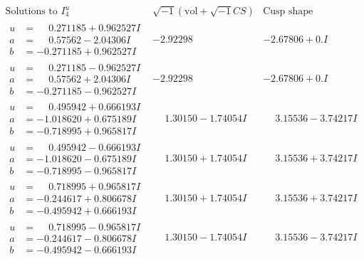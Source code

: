 \documentclass[1p]{elsarticle_modified}
\theoremstyle{definition}
\newcommand{\I}{\sqrt{-1}}
\begin{document}
$$\begin{array}{c|c|c}  
\text{Solutions to }I^u_{4}& \I (\text{vol} + \sqrt{-1}CS) & \text{Cusp shape}\\
 \hline 
\begin{aligned}
u &= \phantom{-}0.271185 + 0.962527 I \\
a &= \phantom{-}0.57562 - 2.04306 I \\
b &= -0.271185 + 0.962527 I\end{aligned}
 & -2.92298\phantom{ +0.000000I} & -2.67806 + 0. I\phantom{ +0.000000I} \\ \hline\begin{aligned}
u &= \phantom{-}0.271185 - 0.962527 I \\
a &= \phantom{-}0.57562 + 2.04306 I \\
b &= -0.271185 - 0.962527 I\end{aligned}
 & -2.92298\phantom{ +0.000000I} & -2.67806 + 0. I\phantom{ +0.000000I} \\ \hline\begin{aligned}
u &= \phantom{-}0.495942 + 0.666193 I \\
a &= -1.018620 + 0.675189 I \\
b &= -0.718995 + 0.965817 I\end{aligned}
 & \phantom{-}1.30150 - 1.74054 I & \phantom{-}3.15536 - 3.74217 I \\ \hline\begin{aligned}
u &= \phantom{-}0.495942 - 0.666193 I \\
a &= -1.018620 - 0.675189 I \\
b &= -0.718995 - 0.965817 I\end{aligned}
 & \phantom{-}1.30150 + 1.74054 I & \phantom{-}3.15536 + 3.74217 I \\ \hline\begin{aligned}
u &= \phantom{-}0.718995 + 0.965817 I \\
a &= -0.244617 + 0.806678 I \\
b &= -0.495942 + 0.666193 I\end{aligned}
 & \phantom{-}1.30150 + 1.74054 I & \phantom{-}3.15536 + 3.74217 I \\ \hline\begin{aligned}
u &= \phantom{-}0.718995 - 0.965817 I \\
a &= -0.244617 - 0.806678 I \\
b &= -0.495942 - 0.666193 I\end{aligned}
 & \phantom{-}1.30150 - 1.74054 I & \phantom{-}3.15536 - 3.74217 I \\ \hline\begin{aligned}

\end{aligned}
\end{array}$$
\end{document}
